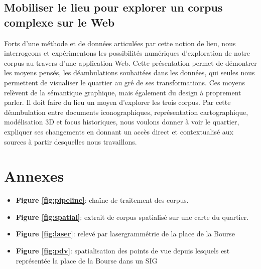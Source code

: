 \documentclass[11pt,french]{article}
\begin{document}
\subsection{Mobiliser le lieu pour explorer un corpus complexe sur le Web}
Forts d’une méthode et de données articulées par cette notion de lieu, nous interrogeons et expérimentons les possibilités numériques d’exploration de notre corpus au travers d’une application Web. Cette présentation permet de démontrer les moyens pensés, les déambulations souhaitées dans les données, qui seules nous permettent de visualiser le quartier au gré de ses transformations. Ces moyens relèvent de la sémantique graphique, mais également du design à proprement parler. Il doit faire du lieu un moyen d’explorer les trois corpus. Par cette déambulation entre documents iconographiques, représentation cartographique, modélisation 3D et focus historiques, nous voulons donner à voir le quartier, expliquer ses changements en donnant un accès direct et contextualisé aux sources à partir desquelles nous travaillons. 

%




\appendix
\section*{Annexes}
\begin{itemize}
	\item \textbf{Figure \ref{fig:pipeline}}: chaîne de traitement des corpus.
	\item \textbf{Figure \ref{fig:spatial}}: extrait de corpus spatialisé sur une carte du quartier.
    \item \textbf{Figure \ref{fig:laser}}: relevé par lasergrammétrie de la place de la Bourse
    \item \textbf{Figure \ref{fig:pdv}}: spatialisation des points de vue depuis lesquels est représentée la place de la Bourse dans un SIG
\end{itemize}
\end{document}
